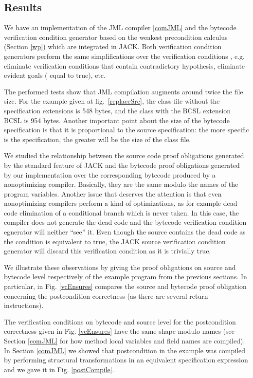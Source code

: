 
\subsection{Results}  \label{results}


We have an implementation of the JML compiler \ref{comJML} and the bytecode verification condition generator based on the weakest precondition calculus (Section \ref{wp}) 
which are integrated in JACK. Both verification condition generators perform the same simplifications over the verification conditions 
, e.g. eliminate verification conditions that contain contradictory hypothesis, eliminate evident goals ( equal to true), etc. 

The performed tests show that JML compilation augments around twice the file size. 
For the example given at fig.~\ref{replaceSrc}, the class file without the specification extensions is 548 bytes, 
and the class with the BCSL extension BCSL is 954 bytes. 
Another important point about the size of the bytecode specification is that it is proportional to the source specification: 
the more specific is the specification, the greater will be the size of the class file. 


We studied the relationship between the source code proof obligations generated 
by the standard feature of JACK and the bytecode proof obligations generated by our implementation over the corresponding bytecode
 produced by a nonoptimizing compiler. Basically, they are the same modulo the names of the program variables. Another issue that
 deserves the attention is that even nonoptimizing compilers perform a kind of optimizations, as for example dead code elimination of
 a conditional branch which is never taken.
In this case, the compiler does not generate the dead code and the bytecode verification condition egnerator will neither ``see'' it. 
Even though the source contains the dead code as the condition is equivalent to true, the JACK source verification condition generator will discard 
this verification condition as it is trivially true.  

 We illustrate these observations by giving the proof obligations on source and bytecode level respectively of the example program
 from the previous sections. In particular, in Fig. \ref{vcEnsures} compares the source and bytecode proof obligation
 concerning the postcondition correctness (as there are several return instructions).

The verification conditions on bytecode and source level for the postcondition  correctness given in Fig. \ref{vcEnsures}
 have the same shape modulo names (see Section \ref{comJML} for how method local variables and field names are compiled). 
 In Section \ref{comJML} we showed that postcondition in the example was compiled by performing structural transformations 
in an equivalent specification expression and we gave it in Fig. \ref{postCompile}. 

